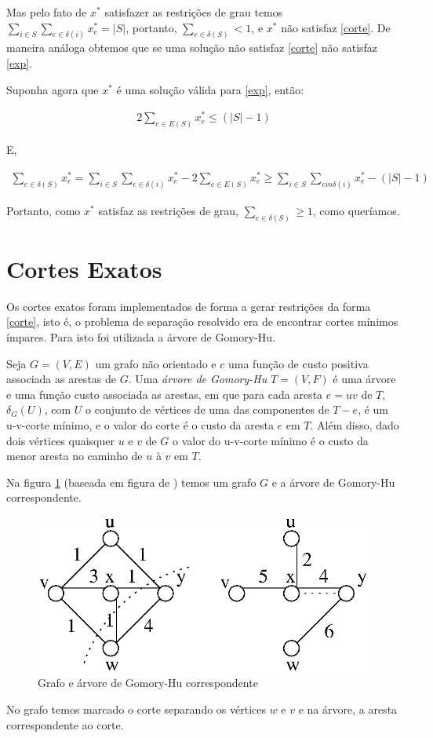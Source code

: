 \documentclass[11pt]{article}
\begin{document}
Mas pelo fato de $x^*$ satisfazer as restrições de grau temos $\sum_{i
  \in S}\sum_{e \in \delta (i)}x_e^* = |S|$, portanto, $\sum_{e \in
  \delta (S)} < 1$, e $x^*$ não satisfaz \eqref{corte}. De maneira
análoga obtemos que se uma solução não satisfaz \eqref{corte} não
satisfaz \eqref{exp}.

Suponha agora que $x^*$ é uma solução válida para \eqref{exp}, então:

\begin{align}
  2\sum_{e \in E(S)}x_e^* \le (|S| - 1)
\end{align}

E,

\begin{align}
  \sum_{e \in \delta (S)}x_e^* = \sum_{i \in S}\sum_{e \in \delta
    (i)}x_e^* - 2\sum_{e \in E(S)}x_e^* \ge \sum_{i \in S}\sum_{e in
    \delta (i)}x_e^* - (|S| - 1)
\end{align}

Portanto, como $x^*$ satisfaz as restrições de grau, $\sum_{e \in
  \delta (S)} \ge 1$, como queríamos.

\section{Cortes Exatos}
Os cortes exatos foram implementados de forma a gerar restrições da
forma \eqref{corte}, isto é, o problema de separação resolvido era de
encontrar cortes mínimos ímpares. Para isto foi utilizada a árvore de
Gomory-Hu.

Seja $G=(V,E)$ um grafo não orientado e $c$ uma função de custo
positiva associada as arestas de $G$. Uma \emph{árvore de Gomory-Hu}
$T=(V,F)$ é uma árvore e uma função custo associada as arestas, em que
para cada aresta $e = uv$ de $T$, $\delta_G(U)$, com $U$ o conjunto de
vértices de uma das componentes de $T-e$, é um u-v-corte mínimo, e o
valor do corte é o custo da aresta $e$ em $T$. Além disso, dado dois
vértices quaisquer $u$ e $v$ de $G$ o valor do u-v-corte mínimo é o
custo da menor aresta no caminho de $u$ à $v$ em $T$.

Na figura \ref{fig:gomoryhu} (baseada em figura de \cite{bondymurty})
temos um grafo $G$ e a árvore de Gomory-Hu correspondente.

\begin{figure}[H]
\centering
\includegraphics[scale=0.40]{gomoryhu.png}
\caption{Grafo e árvore de Gomory-Hu correspondente}
\label{fig:gomoryhu}
\end{figure}

No grafo temos marcado o corte separando os vértices $w$ e $v$ e na
árvore, a aresta correspondente ao corte.



\end{document}
